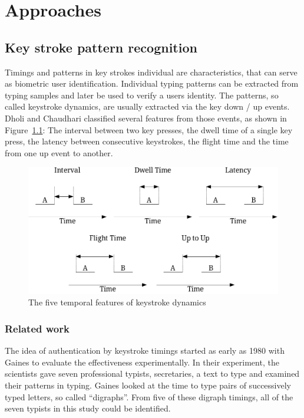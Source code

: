 \chapter{Approaches}\label{chapter:approaches}

\section{Key stroke pattern recognition}
Timings and patterns in key strokes individual are characteristics, that can serve as biometric user identification. Individual typing patterns can be extracted from typing samples and later be used to verify a users identity. The patterns, so called keystroke dynamics, are usually extracted via the key down / up events. Dholi and Chaudhari \cite{dholi2013typing} classified several features from those events, as shown in Figure~\ref{fig:keystrokeFeatures}: The interval between two key presses, the dwell time of a single key press, the latency between consecutive keystrokes, the flight time and the time from one up event to another.

\begin{figure}
    \centering
    \includegraphics[width=\linewidth]{figures/KeystrokeTemporalFeatures.png}
    \caption{The five temporal features of keystroke dynamics \cite{dholi2013typing}}
    \label{fig:keystrokeFeatures}
\end{figure}
\subsection{Related work}
The idea of authentication by keystroke timings started as early as 1980 with Gaines \etal\cite{gaines1980authentication} to evaluate the effectiveness experimentally. In their experiment, the scientists gave seven professional typists, \ie secretaries, a text to type and examined their patterns in typing. Gaines \etal looked at the time to type pairs of successively typed letters, so called ``digraphs''. From five of these digraph timings, all of the seven typists in this study could be identified.

